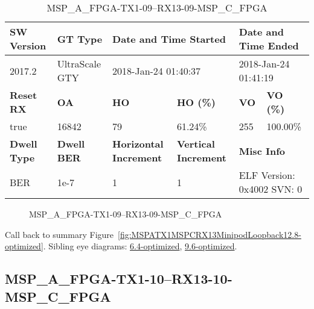 \begin{table}[h]
\centering
\caption{MSP\_A\_FPGA-TX1-09--RX13-09-MSP\_C\_FPGA}
\label{tab:MSPAFPGATX109RX1309MSPCFPGA12.8-optimized}
\begin{tabular}{@{}|l|l|l|l|l|l|@{}}
\toprule
\textbf{SW Version}                & \textbf{GT Type}   & \multicolumn{2}{l|}{\textbf{Date and Time Started}}            & \multicolumn{2}{l|}{\textbf{Date and Time Ended}}        \\ \midrule
2017.2                       & UltraScale GTY          & \multicolumn{2}{l|}{2018-Jan-24 01:40:37}                   & \multicolumn{2}{l|}{2018-Jan-24 01:41:19}               \\ \midrule
\textbf{Reset RX}                  & \textbf{OA} & \textbf{HO}   & \textbf{HO (\%)} & \textbf{VO} & \textbf{VO (\%)} \\ \midrule
true & 16842        & 79          & 61.24\%        & 255        & 100.00\%       \\ \midrule
\textbf{Dwell Type}                & \textbf{Dwell BER} & \textbf{Horizontal Increment} & \textbf{Vertical Increment}    & \multicolumn{2}{l|}{\textbf{Misc Info}}                  \\ \midrule
BER                            & 1e-7        & 1        & 1           & \multicolumn{2}{l|}{ELF Version: 0x4002 SVN: 0}                         \\ \bottomrule
\end{tabular}
\end{table}

\begin{figure}[h]
\caption{MSP\_A\_FPGA-TX1-09--RX13-09-MSP\_C\_FPGA} \label{fig:MSPAFPGATX109RX1309MSPCFPGA12.8-optimized}
\end{figure}

Call back to summary Figure~\ref{fig:MSPATX1MSPCRX13MinipodLoopback12.8-optimized}.
Sibling eye diagrams: \hyperref[sec:MSPAFPGATX109RX1309MSPCFPGA6.4-optimized]{6.4-optimized}, \hyperref[sec:MSPAFPGATX109RX1309MSPCFPGA9.6-optimized]{9.6-optimized}.

\clearpage
\newpage


\subsection{MSP\_A\_FPGA-TX1-10--RX13-10-MSP\_C\_FPGA}\label{sec:MSPAFPGATX110RX1310MSPCFPGA12.8-optimized}

